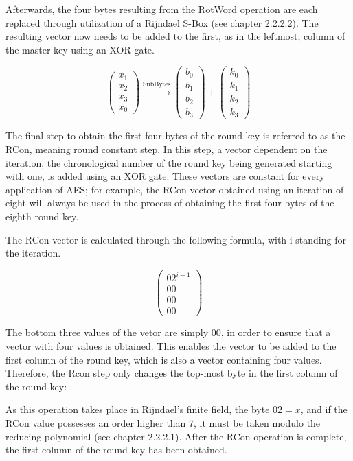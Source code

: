 \documentclass[12pt]{report}
\theoremstyle{definition}
\theoremstyle{remark}
\begin{document}
Afterwards, the four bytes resulting from the RotWord operation are each replaced through utilization of a Rijndael S-Box (see chapter 2.2.2.2). The resulting vector now needs to be added to the first, as in the leftmost, column of the master key using an XOR gate.

\[
\left( \begin{array}{c}
x_1 \\
x_2 \\
x_3 \\
x_0\end{array} \right)
\xrightarrow{\text{SubBytes}}
\left( \begin{array}{c}
b_0 \\
b_1 \\
b_2 \\
b_3\end{array} \right)
+
\left( \begin{array}{c}
k_0 \\
k_1 \\
k_2 \\
k_3\end{array} \right)
\]

The final step to obtain the first four bytes of the round key is referred to as the RCon, meaning round constant step\cite[p. 15]{Rijndael}. In this step, a vector dependent on the iteration, the chronological number of the round key being generated starting with one, is added using an XOR gate. These vectors are constant for every application of AES; for example, the RCon vector obtained using an iteration of eight will always be used in the process of obtaining the first four bytes of the eighth round key.

The RCon vector is calculated through the following formula, with i standing for the iteration.

\[ \left( \begin{array}{c}
{02}^{i-1}\\
00 \\
00 \\
00\end{array} \right) \]

The bottom three values of the vetor are simply 00, in order to ensure that a vector with four values is obtained. This enables the vector to be added to the first column of the round key, which is also a vector containing four values. Therefore, the Rcon step only changes the top-most byte in the first column of the round key:

As this operation takes place in Rijndael's finite field, the byte ${02} = x$, and if the RCon value possesses an order higher than 7, it must be taken modulo the reducing polynomial (see chapter 2.2.2.1). After the RCon operation is complete, the first column of the round key has been obtained.
\end{document}
